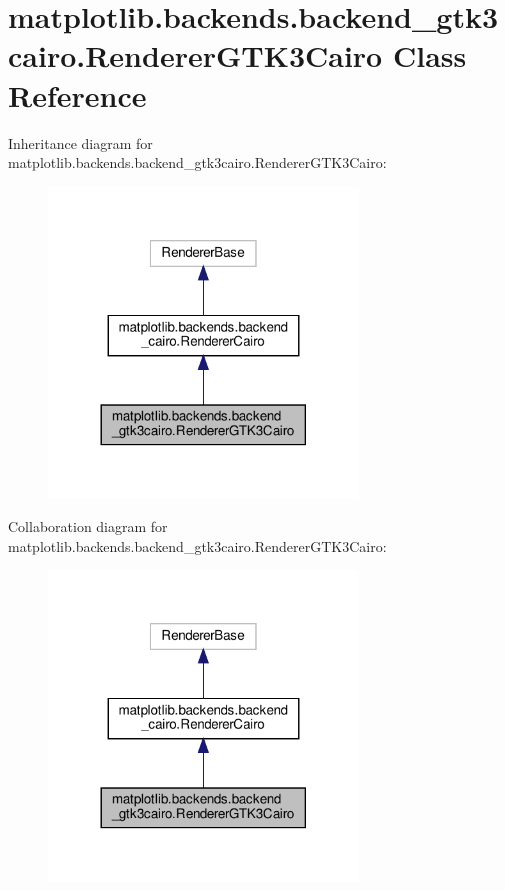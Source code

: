 \hypertarget{classmatplotlib_1_1backends_1_1backend__gtk3cairo_1_1RendererGTK3Cairo}{}\section{matplotlib.\+backends.\+backend\+\_\+gtk3cairo.\+Renderer\+G\+T\+K3\+Cairo Class Reference}
\label{classmatplotlib_1_1backends_1_1backend__gtk3cairo_1_1RendererGTK3Cairo}


Inheritance diagram for matplotlib.\+backends.\+backend\+\_\+gtk3cairo.\+Renderer\+G\+T\+K3\+Cairo\+:
\nopagebreak
\begin{figure}[H]
\begin{center}
\leavevmode
\includegraphics[width=233pt]{classmatplotlib_1_1backends_1_1backend__gtk3cairo_1_1RendererGTK3Cairo__inherit__graph}
\end{center}
\end{figure}


Collaboration diagram for matplotlib.\+backends.\+backend\+\_\+gtk3cairo.\+Renderer\+G\+T\+K3\+Cairo\+:
\nopagebreak
\begin{figure}[H]
\begin{center}
\leavevmode
\includegraphics[width=233pt]{classmatplotlib_1_1backends_1_1backend__gtk3cairo_1_1RendererGTK3Cairo__coll__graph}
\end{center}
\end{figure}
